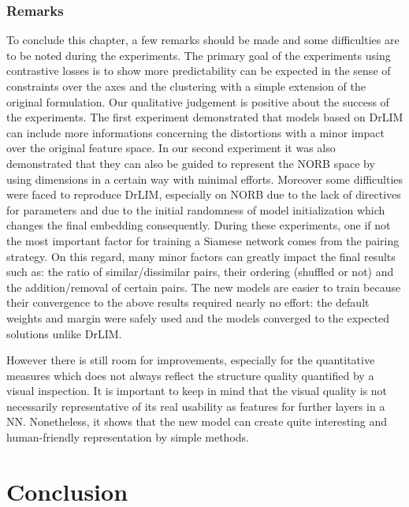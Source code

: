 \documentclass[a4paper,12pt]{report}
\begin{document}
\subsection{Remarks}
To conclude this chapter, a few remarks should be made and some difficulties are to be noted during the experiments.
The primary goal of the experiments using contrastive losses is to show more predictability can be expected in the sense of constraints over the axes and the clustering with a simple extension of the original formulation.
Our qualitative judgement is positive about the success of the experiments.
The first experiment demonstrated that models based on DrLIM can include more informations concerning the distortions with a minor impact over the original feature space.
In our second experiment it was also demonstrated that they can also be guided to represent the NORB space by using dimensions in a certain way with minimal efforts.
Moreover some difficulties were faced to reproduce DrLIM, especially on NORB due to the lack of directives for parameters and due to the initial randomness of model initialization which changes the final embedding consequently.
During these experiments, one if not the most important factor for training a Siamese network comes from the pairing strategy.
On this regard, many minor factors can greatly impact the final results such as: the ratio of similar/dissimilar pairs, their ordering (shuffled or not) and the addition/removal of certain pairs.
The new models are easier to train because their convergence to the above results required nearly no effort: the default weights and margin were safely used and the models converged to the expected solutions unlike DrLIM.

However there is still room for improvements, especially for the quantitative measures which does not always reflect the structure quality quantified by a visual inspection.
It is important to keep in mind that the visual quality is not necessarily representative of its real usability as features for further layers in a NN.
Nonetheless, it shows that the new model can create quite interesting and human-friendly representation by simple methods.


\chapter{Conclusion}
\label{chap:conclusion}
\end{document}
